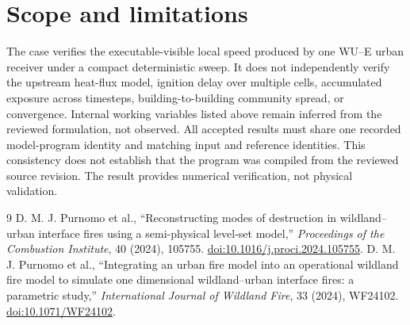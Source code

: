 \section{Scope and limitations}

The case verifies the executable-visible local speed produced by one WU--E
urban receiver under a compact deterministic sweep.  It does not independently
verify the upstream heat-flux model, ignition delay over multiple cells, accumulated exposure across
timesteps, building-to-building community spread, or convergence.  Internal
working variables listed above remain inferred from the reviewed formulation,
not observed. All accepted results must share one recorded model-program
identity and matching input and reference identities. This consistency does
not establish that the program was compiled from the reviewed source revision.
The result provides numerical verification, not physical validation.

\begin{thebibliography}{9}
 D. M. J. Purnomo et al., ``Reconstructing modes of destruction in wildland--urban interface fires using a semi-physical level-set model,'' \emph{Proceedings of the Combustion Institute}, 40 (2024), 105755. \href{https://doi.org/10.1016/j.proci.2024.105755}{doi:10.1016/j.proci.2024.105755}.
 D. M. J. Purnomo et al., ``Integrating an urban fire model into an operational wildland fire model to simulate one dimensional wildland--urban interface fires: a parametric study,'' \emph{International Journal of Wildland Fire}, 33 (2024), WF24102. \href{https://doi.org/10.1071/WF24102}{doi:10.1071/WF24102}.
\end{thebibliography}
